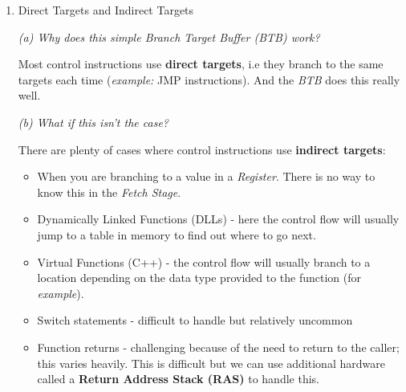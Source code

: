 \documentclass[12pt]{article}
\newenvironment{QandA}{\begin{enumerate}[label=\bfseries\arabic*.]\bfseries}
                      {\end{enumerate}}
\newenvironment{answered}{\par\quad\normalfont}{}
\begin{document}
\begin{QandA}
\begin{answered}
To avoid this situation, an additional \textbf{tag field} is introduced which associates a given \textit{Branch Target Buffer (BTB)} entry with a particular \textit{Program Counter (PC)}, which is used to tag that particular branching instruction. 

During the actual \textbf{\textit{BTB} update}, this will look like:
\begin{equation*}
\begin{split}
    BTB[PC].tag = & \ PC \\
    BTB[PC].target = & \ \text{target of branch} 
\end{split}
\end{equation*}

And at the \textbf{\textit{BTB} prediction step} in the \textit{Fetch Stage}, this will look like:
\begin{equation*}
    \begin{split}
        Predicted\ PC\ = (BTB[PC].tag == PC)\ ?\ BTB[PC].target\ :\ PC + 4
    \end{split}
\end{equation*}
\end{answered}
\vspace{-0.8cm}

\item Direct Targets and Indirect Targets
\begin{answered}
\textit{(a) Why does this simple \textit{Branch Target Buffer (BTB)} work?}

Most control instructions use \textbf{direct targets}, i.e they branch to the same targets each time (\textit{example:} JMP instructions). And the \textit{BTB} does this really well.

\qquad \textit{(b) What if this isn't the case?}

There are plenty of cases where control instructions use \textbf{indirect targets}:
\begin{itemize}
    \item When you are branching to a value in a \textit{Register}. There is no way to know this in the \textit{Fetch Stage}.
    \item Dynamically Linked Functions (DLLs) - here the control flow will usually jump to a table in memory to find out where to go next.
    \item Virtual Functions (C++) - the control flow will usually branch to a location depending on the data type provided to the function (for \textit{example}).
    \item Switch statements - difficult to handle but relatively uncommon
    \item Function returns - challenging because of the need to return to the caller; this varies heavily. This is difficult but we can use additional hardware called a \textbf{Return Address Stack (RAS)} to handle this.
\end{itemize}
\end{answered}


\end{QandA}
\end{document}
